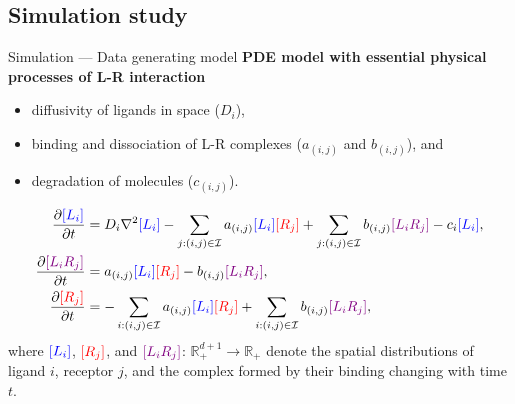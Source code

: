 \documentclass[10pt]{beamer}
\begin{document}
\subsection{Simulation study}
\begin{frame}{Simulation 
--- Data generating model}
    \textbf{PDE model with essential physical processes of L-R interaction}
    \begin{itemize}
        \item diffusivity of ligands in space ($D_i$),
        \item binding and dissociation of L-R complexes ($a_{(i,j)}$ and $b_{(i,j)}$), and 
        \item degradation of molecules ($c_{(i,j)}$).
    \end{itemize}
    {\small
    \begin{align}
        \frac{\partial {\color{blue}[L_i]}}{\partial t} 
        & = D_i\nabla^2{\color{blue}[L_i]} 
        - \sum_{j:(i,j)\in\mathcal{I}}a_{(i,j)}{\color{blue}[L_i]}{\color{red}[R_j]} 
        + \sum_{j:(i,j)\in\mathcal{I}}b_{(i,j)}{\color{violet}[L_i R_j]}
        - c_i{\color{blue}[L_i]}, \\
        \frac{\partial {\color{violet}[L_i R_j]}}{\partial t}
        & = a_{(i,j)}{\color{blue}[L_i]}{\color{red}[R_j]}
        - b_{(i,j)} {\color{violet}[L_i R_j]}, \\
        \frac{\partial {\color{red}[R_j]}}{\partial t}
        & = - \sum_{i:(i,j)\in\mathcal{I}} a_{(i,j)}{\color{blue}[L_i]}{\color{red}[R_j]}
        + \sum_{i:(i,j)\in\mathcal{I}} b_{(i,j)}{\color{violet}[L_i R_j]},
    \end{align}
    where ${\color{blue}[L_i]}$, ${\color{red}[R_j]}$, and ${\color{violet}[L_i R_j]}$: $\mathbb{R}_+^{d + 1}\to\mathbb{R}_+$ denote the spatial distributions of 
    {\color{blue}ligand $i$}, {\color{red}receptor $j$}, and the {\color{violet}complex} formed by their binding changing with time $t$.
    }
\end{frame}
\end{document}
